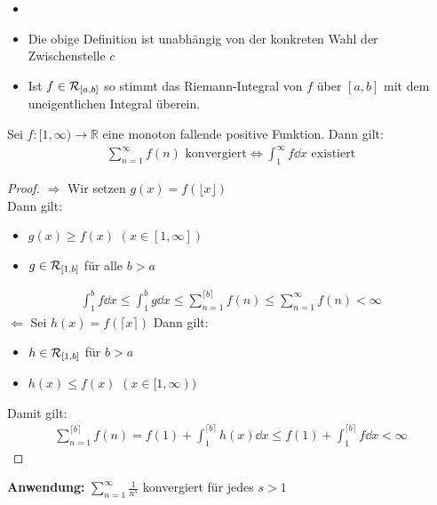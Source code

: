 \begin{Bemerkung}{
	\begin{itemize}
		\item[ ]
		\item Die obige Definition ist unabhängig von der konkreten Wahl der 
		Zwischenstelle $c$
		\item Ist $f \in \mathcal{R}_{[{a},{b}]}$ so stimmt das Riemann-Integral von $f$ über 
		$[a,b]$ mit dem uneigentlichen Integral überein.
	\end{itemize}
}\end{Bemerkung}

\begin{Satz}{
	Sei $f : [1, \infty) \rightarrow \mathbb{R}$ eine monoton fallende 
	positive Funktion. 
	Dann gilt:
	\begin{align*}
		\sum_{n = 1}^{\infty} f(n) \text{ konvergiert} \Leftrightarrow 
		\int_1^{\infty} f \dd{x} \text{ existiert}
	\end{align*}
}\end{Satz}

\begin{proof}
	$\Rightarrow$ Wir setzen $g(x) = f( \lfloor x \rfloor )$ \\
	Dann gilt:
	\begin{itemize}
		\item $g(x) \geq f(x)$ $(x \in [1, \infty])$
		\item $g \in \mathcal{R}_{[{1},{b}]}$ für alle $ b > a$
	\end{itemize}
	\begin{align*}
		\int_1^b f \dd{x} \leq \int_1^b g \dd{x} \leq \sum_{n = 1}^{\lceil b \rceil}
		f(n) \leq \sum_{n=1}^{\infty} f(n) < \infty 
	\end{align*}
	$\Leftarrow$ Sei $ h(x) = f(\lceil x \rceil )$ Dann gilt:
	\begin{itemize}
		\item $h \in \mathcal{R}_{[{1},{b}]} $ für $b >a$
		\item $h(x) \leq f(x) $ $ (x \in [1, \infty)) $
	\end{itemize}
	Damit gilt:
	\begin{align*}
		\sum_{n = 1}^{\lceil b \rceil }f(n) = f(1) + 
		\int_1^{\lceil b \rceil}h(x) \dd{x} 
		\leq f(1) + \int_1^{\lceil b \rceil} f \dd{x} < \infty
	\end{align*}
\end{proof}

\textbf{Anwendung:} $\sum_{n=1}^{\infty}\frac{1}{n^s}$ konvergiert für jedes $s > 1$

